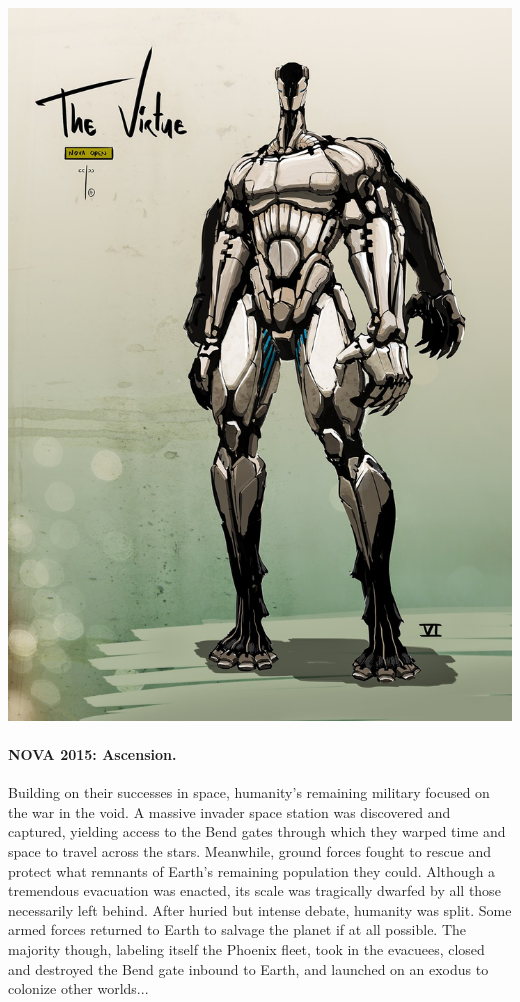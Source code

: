 \begin{minipage}[c]{0.4\linewidth}%
  \includegraphics[width=\linewidth]{art/characters/virtue-warrior.jpg}
\end{minipage}

\paragraph{NOVA 2015: Ascension.}  Building on their successes in
space, humanity's remaining military focused on the war in the void.
A massive invader space station was discovered and captured, yielding
access to the Bend gates through which they warped time and space to
travel across the stars.  Meanwhile, ground forces fought to rescue
and protect what remnants of Earth's remaining population they could.
Although a tremendous evacuation was enacted, its scale was tragically
dwarfed by all those necessarily left behind.  After huried but
intense debate, humanity was split.  Some armed forces returned to
Earth to salvage the planet if at all possible. The majority though,
labeling itself the Phoenix fleet, took in the evacuees, closed and
destroyed the Bend gate inbound to Earth, and launched on an exodus to
colonize other worlds...

